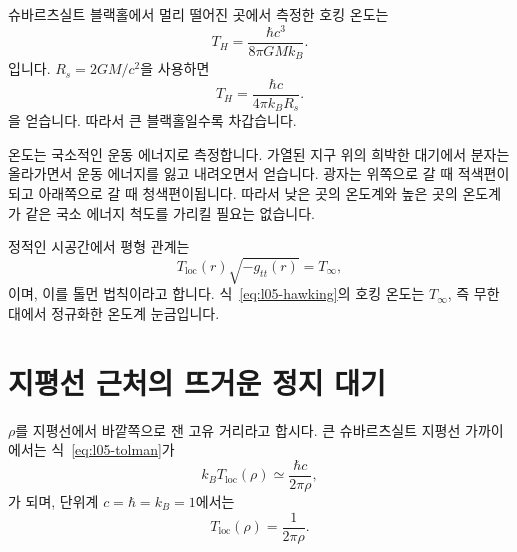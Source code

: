 슈바르츠실트 블랙홀에서 멀리 떨어진 곳에서 측정한 호킹 온도는
\begin{equation}
T_H=\frac{\hbar c^3}{8\pi GMk_B}.
\label{eq:l05-hawking}
\end{equation}
입니다. \(R_s=2GM/c^2\)을 사용하면
\begin{equation}
T_H=\frac{\hbar c}{4\pi k_B R_s}.
\label{eq:l05-hawking-radius}
\end{equation}
을 얻습니다.
따라서 큰 블랙홀일수록 차갑습니다.

\begin{classroomqa}
\end{classroomqa}

온도는 국소적인 운동 에너지로 측정합니다. 가열된 지구 위의 희박한 대기에서 분자는 올라가면서 운동 에너지를 잃고 내려오면서 얻습니다. 광자는 위쪽으로 갈 때 적색편이되고 아래쪽으로 갈 때 청색편이됩니다. 따라서 낮은 곳의 온도계와 높은 곳의 온도계가 같은 국소 에너지 척도를 가리킬 필요는 없습니다.

정적인 시공간에서 평형 관계는
\begin{equation}
T_{\mathrm{loc}}(r)\sqrt{-g_{tt}(r)}=T_\infty,
\label{eq:l05-tolman}
\end{equation}
이며, 이를 톨먼 법칙이라고 합니다. 식~\eqref{eq:l05-hawking}의 호킹 온도는 \(T_\infty\), 즉 무한대에서 정규화한 온도계 눈금입니다.

\section{지평선 근처의 뜨거운 정지 대기}

\(\rho\)를 지평선에서 바깥쪽으로 잰 고유 거리라고 합시다. 큰 슈바르츠실트 지평선 가까이에서는 식~\eqref{eq:l05-tolman}가
\begin{equation}
k_B T_{\mathrm{loc}}(\rho)
\simeq\frac{\hbar c}{2\pi\rho},
\label{eq:l05-local-temperature-si}
\end{equation}
가 되며, 단위계 \(c=\hbar=k_B=1\)에서는
\begin{equation}
T_{\mathrm{loc}}(\rho)=\frac{1}{2\pi\rho}.
\label{eq:l05-local-temperature}
\end{equation}

